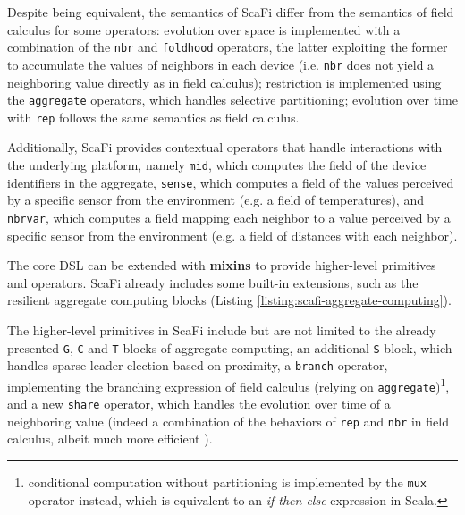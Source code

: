 Despite being equivalent, the semantics of \ac{ScaFi} differ from the semantics
of field calculus for some operators: evolution over space is implemented with
a combination of the \texttt{nbr} and \texttt{foldhood} operators, the latter
exploiting the former to accumulate the values of neighbors in each device
(i.e. \texttt{nbr} does not yield a neighboring value directly as in field
calculus); restriction is implemented using the \texttt{aggregate} operators,
which handles selective partitioning; evolution over time with \texttt{rep}
follows the same semantics as field calculus.

Additionally, \ac{ScaFi} provides contextual operators that handle interactions
with the underlying platform, namely \texttt{mid}, which computes the field of
the device identifiers in the aggregate, \texttt{sense}, which computes a field
of the values perceived by a specific sensor from the environment (e.g. a field
of temperatures), and \texttt{nbrvar}, which computes a field mapping each
neighbor to a value perceived by a specific sensor from the environment (e.g. a
field of distances with each neighbor).

The core \ac{DSL} can be extended with \textbf{mixins} to provide higher-level
primitives and operators. \ac{ScaFi} already includes some built-in extensions,
such as the resilient aggregate computing blocks (Listing
\ref{listing:scafi-aggregate-computing}).



The higher-level primitives in \ac{ScaFi} include but are not limited to the
already presented \texttt{G}, \texttt{C} and \texttt{T} blocks of aggregate
computing, an additional \texttt{S} block, which handles sparse leader election
based on proximity, a \texttt{branch} operator, implementing the branching
expression of field calculus (relying on
\texttt{aggregate})\footnote{conditional computation without partitioning is
implemented by the \texttt{mux} operator instead, which is equivalent to an
\textit{if-then-else} expression in Scala.}, and a new \texttt{share} operator,
which handles the evolution over time of a neighboring value (indeed a
combination of the behaviors of \texttt{rep} and \texttt{nbr} in field
calculus, albeit much more efficient \cite{ScaFi-ShareOperator}).

